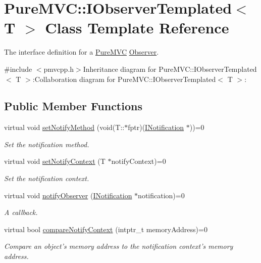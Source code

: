 \hypertarget{class_pure_m_v_c_1_1_i_observer_templated}{
\section{PureMVC::IObserverTemplated$<$ T $>$ Class Template Reference}
\label{class_pure_m_v_c_1_1_i_observer_templated}
}


The interface definition for a \hyperlink{namespace_pure_m_v_c}{PureMVC} \hyperlink{class_pure_m_v_c_1_1_observer}{Observer}.  


{\ttfamily \#include $<$pmvcpp.h$>$}Inheritance diagram for PureMVC::IObserverTemplated$<$ T $>$:Collaboration diagram for PureMVC::IObserverTemplated$<$ T $>$:\subsection*{Public Member Functions}
\begin{DoxyCompactItemize}
\item 
virtual void \hyperlink{class_pure_m_v_c_1_1_i_observer_templated_a6d8b0b888b2d1efd0801b75451e7c8df}{setNotifyMethod} (void(T::$\ast$fptr)(\hyperlink{class_pure_m_v_c_1_1_i_notification}{INotification} $\ast$))=0
\begin{DoxyCompactList}\small\item\em Set the notification method. \item\end{DoxyCompactList}\item 
virtual void \hyperlink{class_pure_m_v_c_1_1_i_observer_templated_ad2f9264afea485375876ef3a976b0ba5}{setNotifyContext} (T $\ast$notifyContext)=0
\begin{DoxyCompactList}\small\item\em Set the notification context. \item\end{DoxyCompactList}\item 
virtual void \hyperlink{class_pure_m_v_c_1_1_i_observer_restricted_a808a9378a31b068f285fe0b4446048e1}{notifyObserver} (\hyperlink{class_pure_m_v_c_1_1_i_notification}{INotification} $\ast$notification)=0
\begin{DoxyCompactList}\small\item\em A callback. \item\end{DoxyCompactList}\item 
virtual bool \hyperlink{class_pure_m_v_c_1_1_i_observer_restricted_a773762b441d4944e77b5b53789a4c52b}{compareNotifyContext} (intptr\_\-t memoryAddress)=0
\begin{DoxyCompactList}\small\item\em Compare an object's memory address to the notification context's memory address. \item\end{DoxyCompactList}\end{DoxyCompactItemize}


